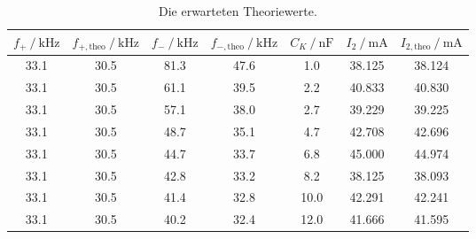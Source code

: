 \begin{table}
  \centering
  \caption{Die erwarteten Theoriewerte.}
  \label{tab:theorietabelle}
  \begin{tabular}{c c c c c c c}
      \toprule
      $f_+ \:/\: \si{\kilo\hertz}$ & $f_{+, \text{theo}} \:/\: \si{\kilo\hertz}$ & $f_- \:/\: \si{\kilo\hertz}$ & $f_{-, \text{theo}} \:/\: \si{\kilo\hertz}$ & $C_K \:/\: \si{\nano\farad}$ & $I_2 \:/\: \si{\milli\ampere}$ & $I_{2,\text{theo}} \:/\: \si{\milli\ampere}$ \\
      \midrule
      33.1 & 30.5 & 81.3 & 47.6 & 1.0  &  38.125 & 38.124 \\  
      33.1 & 30.5 & 61.1 & 39.5 & 2.2  &  40.833 & 40.830 \\
      33.1 & 30.5 & 57.1 & 38.0 & 2.7  &  39.229 & 39.225 \\
      33.1 & 30.5 & 48.7 & 35.1 & 4.7  &  42.708 & 42.696 \\
      33.1 & 30.5 & 44.7 & 33.7 & 6.8  &  45.000 & 44.974 \\
      33.1 & 30.5 & 42.8 & 33.2 & 8.2  &  38.125 & 38.093 \\
      33.1 & 30.5 & 41.4 & 32.8 & 10.0 &  42.291 & 42.241 \\
      33.1 & 30.5 & 40.2 & 32.4 & 12.0 &  41.666 & 41.595 \\
      \bottomrule
  \end{tabular}
\end{table}

\pagebreak